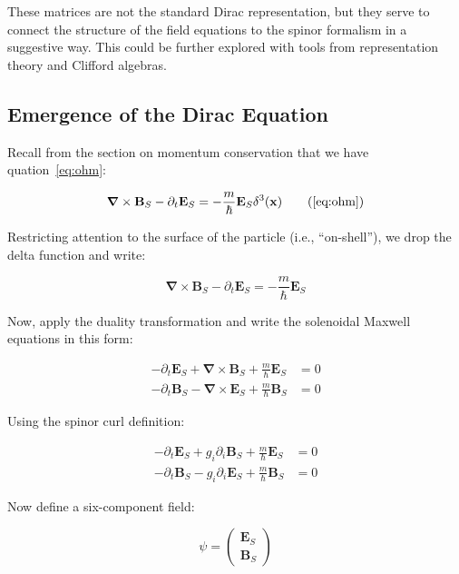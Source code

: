 \documentclass {article}
\renewcommand\vec{\mathbf}
\let\OldS\nabla
\renewcommand{\nabla}{\boldsymbol{\OldS}}
\begin{document}
These matrices are not the standard Dirac representation, but they serve to connect the structure of the field equations to the spinor formalism in a suggestive way. This could be further explored with tools from representation theory and Clifford algebras.

\subsection{Emergence of the Dirac Equation}

Recall from the section on momentum conservation that we have quation~\eqref{eq:ohm}:

\begin{equation}
\nabla \times \vec{B}_S - \partial_t \vec{E}_S = -\frac{m}{\hbar} \vec{E}_S \delta^3(\vec{x})
\tag{\ref{eq:ohm}}
\end{equation}

Restricting attention to the surface of the particle (i.e., “on-shell”), we drop the delta function and write:

\begin{equation}
\nabla \times \vec{B}_S - \partial_t \vec{E}_S = -\frac{m}{\hbar} \vec{E}_S
\end{equation}

Now, apply the duality transformation and write the solenoidal Maxwell equations in this form:

\begin{equation}
\begin{aligned}
-\partial_t \vec{E}_S + \nabla \times \vec{B}_S + \frac{m}{\hbar} \vec{E}_S &= 0 \\
-\partial_t \vec{B}_S - \nabla \times \vec{E}_S + \frac{m}{\hbar} \vec{B}_S &= 0
\end{aligned}
\end{equation}

Using the spinor curl definition:

\begin{equation}
\begin{aligned}
-\partial_t \vec{E}_S + g_i \partial_i \vec{B}_S + \frac{m}{\hbar} \vec{E}_S &= 0 \\
-\partial_t \vec{B}_S - g_i \partial_i \vec{E}_S + \frac{m}{\hbar} \vec{B}_S &= 0
\end{aligned}
\end{equation}


Now define a six-component field:

\begin{equation}
\psi = \begin{pmatrix}
\vec{E}_S \\
\vec{B}_S
\end{pmatrix}
\end{equation}
\end{document}
